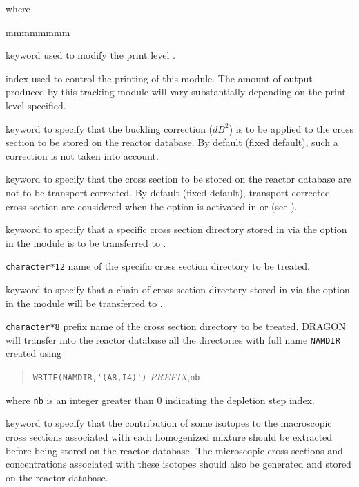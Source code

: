 \noindent
 where

\begin{ListeDeDescription}{mmmmmmmm}
\item[\moc{EDIT}] keyword used to modify the print level .

\item[\dusa{iprint}] index used to control the printing of this module. The amount of output produced by this
tracking module will vary substantially depending on the print level specified.

\item[\moc{B2}] keyword to specify that the buckling correction ($dB^{2}$) is to be applied to the cross
section to be stored on the reactor database. By default (fixed default), such a correction is not taken into
account.

\item[\moc{NOTR}] keyword to specify that the cross section to be stored on the reactor database are not to
be transport corrected. By default (fixed default), transport corrected cross section are considered when
the  option is activated in  or  (see ).

\item[\moc{STEP}] keyword to specify that a specific cross section directory stored in  via the
 option in the  module is to be transferred to .

\item[\dusa{NOMDIR}] \verb|character*12| name of the specific cross section directory to be treated.

\item[\moc{BURNUP}] keyword to specify that a chain of cross section directory stored in  via
the  option in the  module will be transferred to .

\item[\dusa{PREFIX}] \texttt{character*8} prefix name of the cross section directory to be treated. DRAGON
will transfer into the reactor database all the directories with full name \verb|NAMDIR| created using

\begin{quote}
\verb|WRITE(NAMDIR,'(A8,I4)')| \textit{PREFIX},\verb|nb|
\end{quote}
 where \verb|nb| is an integer greater than 0 indicating the depletion step index. 

\item[\moc{EXTRACT}] keyword to specify that the contribution of some isotopes to the macroscopic cross
sections associated with each homogenized mixture should be extracted before being stored on the reactor
database. The microscopic cross sections and concentrations associated with these isotopes should also be
generated and stored on the reactor database.  


\end{ListeDeDescription}
